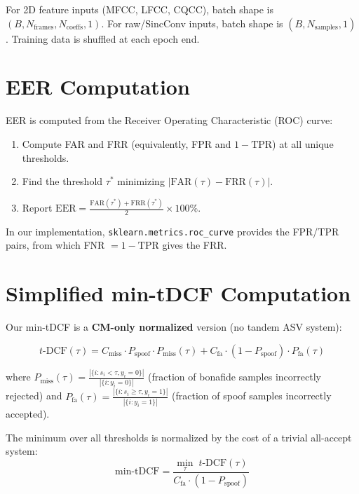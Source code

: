\documentclass[12pt]{report}
\begin{document}
For 2D feature inputs (MFCC, LFCC, CQCC), batch shape is $(B, N_\text{frames}, N_\text{coeffs}, 1)$.
For raw/SincConv inputs, batch shape is $(B, N_\text{samples}, 1)$.
Training data is shuffled at each epoch end.

\section{EER Computation}

EER is computed from the Receiver Operating Characteristic (ROC) curve:
\begin{enumerate}[noitemsep]
    \item Compute FAR and FRR (equivalently, FPR and $1 - \text{TPR}$) at all unique thresholds.
    \item Find the threshold $\tau^*$ minimizing $|\text{FAR}(\tau) - \text{FRR}(\tau)|$.
    \item Report $\text{EER} = \frac{\text{FAR}(\tau^*) + \text{FRR}(\tau^*)}{2} \times 100\%$.
\end{enumerate}

In our implementation, \texttt{sklearn.metrics.roc\_curve} provides the FPR/TPR pairs, from
which FNR $= 1 - \text{TPR}$ gives the FRR.

\section{Simplified min-tDCF Computation}

Our min-tDCF is a \textbf{CM-only normalized} version (no tandem ASV system):

\begin{equation}
    t\text{-DCF}(\tau) = C_\text{miss} \cdot P_\text{spoof} \cdot P_\text{miss}(\tau)
                        + C_\text{fa} \cdot (1 - P_\text{spoof}) \cdot P_\text{fa}(\tau)
\end{equation}

where $P_\text{miss}(\tau) = \frac{|\{i : s_i < \tau, y_i = 0\}|}{|\{i : y_i = 0\}|}$ (fraction
of bonafide samples incorrectly rejected) and $P_\text{fa}(\tau) = \frac{|\{i : s_i \geq \tau, y_i = 1\}|}{|\{i : y_i = 1\}|}$ (fraction of spoof samples incorrectly accepted).

The minimum over all thresholds is normalized by the cost of a trivial all-accept system:
\begin{equation}
    \text{min-tDCF} = \frac{\min_\tau \; t\text{-DCF}(\tau)}{C_\text{fa} \cdot (1 - P_\text{spoof})}
\end{equation}
\end{document}
